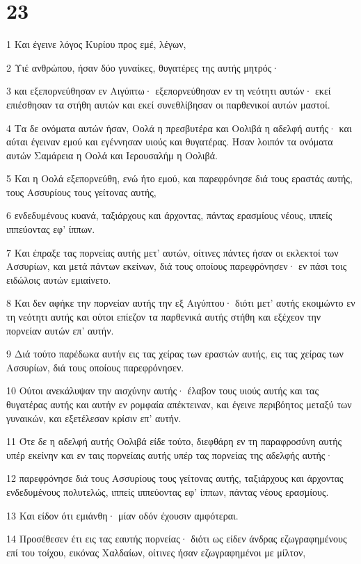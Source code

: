\chapter{23}

\par 1 Και έγεινε λόγος Κυρίου προς εμέ, λέγων,
\par 2 Υιέ ανθρώπου, ήσαν δύο γυναίκες, θυγατέρες της αυτής μητρός·
\par 3 και εξεπορνεύθησαν εν Αιγύπτω· εξεπορνεύθησαν εν τη νεότητι αυτών· εκεί επιέσθησαν τα στήθη αυτών και εκεί συνεθλίβησαν οι παρθενικοί αυτών μαστοί.
\par 4 Τα δε ονόματα αυτών ήσαν, Οολά η πρεσβυτέρα και Οολιβά η αδελφή αυτής· και αύται έγειναν εμού και εγέννησαν υιούς και θυγατέρας. Ήσαν λοιπόν τα ονόματα αυτών Σαμάρεια η Οολά και Ιερουσαλήμ η Οολιβά.
\par 5 Και η Οολά εξεπορνεύθη, ενώ ήτο εμού, και παρεφρόνησε διά τους εραστάς αυτής, τους Ασσυρίους τους γείτονας αυτής,
\par 6 ενδεδυμένους κυανά, ταξιάρχους και άρχοντας, πάντας ερασμίους νέους, ιππείς ιππεύοντας εφ' ίππων.
\par 7 Και έπραξε τας πορνείας αυτής μετ' αυτών, οίτινες πάντες ήσαν οι εκλεκτοί των Ασσυρίων, και μετά πάντων εκείνων, διά τους οποίους παρεφρόνησεν· εν πάσι τοις ειδώλοις αυτών εμιαίνετο.
\par 8 Και δεν αφήκε την πορνείαν αυτής την εξ Αιγύπτου· διότι μετ' αυτής εκοιμώντο εν τη νεότητι αυτής και ούτοι επίεζον τα παρθενικά αυτής στήθη και εξέχεον την πορνείαν αυτών επ' αυτήν.
\par 9 Διά τούτο παρέδωκα αυτήν εις τας χείρας των εραστών αυτής, εις τας χείρας των Ασσυρίων, διά τους οποίους παρεφρόνησεν.
\par 10 Ούτοι ανεκάλυψαν την αισχύνην αυτής· έλαβον τους υιούς αυτής και τας θυγατέρας αυτής και αυτήν εν ρομφαία απέκτειναν, και έγεινε περιβόητος μεταξύ των γυναικών, και εξετέλεσαν κρίσιν επ' αυτήν.
\par 11 Ότε δε η αδελφή αυτής Οολιβά είδε τούτο, διεφθάρη εν τη παραφροσύνη αυτής υπέρ εκείνην και εν ταις πορνείαις αυτής υπέρ τας πορνείας της αδελφής αυτής·
\par 12 παρεφρόνησε διά τους Ασσυρίους τους γείτονας αυτής, ταξιάρχους και άρχοντας ενδεδυμένους πολυτελώς, ιππείς ιππεύοντας εφ' ίππων, πάντας νέους ερασμίους.
\par 13 Και είδον ότι εμιάνθη· μίαν οδόν έχουσιν αμφότεραι.
\par 14 Προσέθεσεν έτι εις τας εαυτής πορνείας· διότι ως είδεν άνδρας εζωγραφημένους επί του τοίχου, εικόνας Χαλδαίων, οίτινες ήσαν εζωγραφημένοι με μίλτον,
